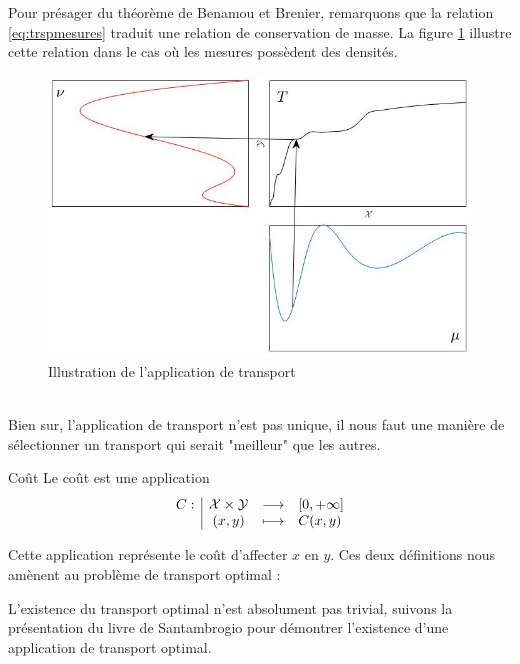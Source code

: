 \documentclass[a4paper,12pt]{article}
\begin{document}
Pour présager du théorème de Benamou et Brenier, remarquons que la relation \eqref{eq:trspmesures} traduit une relation de conservation de masse. La figure \ref{fig:illustrans} illustre cette relation dans le cas où les mesures possèdent des densités.
\begin{figure}[!h]
\centering
\includegraphics[width=0.8\linewidth]{img/transport.jpg}
\caption{\label{fig:illustrans}Illustration de l'application de transport}
\end{figure}\\
Bien sur, l'application de transport n'est pas unique, il nous faut une manière de sélectionner un transport qui serait "meilleur" que les autres. 
\newpage
\begin{definition}{Coût}
Le coût est une application 
$$
\begin{array}[t]{l|ccl} C: & \mathcal{X}\times\mathcal{Y} & \longrightarrow & [0,+\infty] \\ & (x,y) & \longmapsto & C(x,y) \end{array}
$$
\end{definition}
Cette application représente le coût d'affecter $x$ en $y$. Ces deux définitions nous amènent au problème de transport optimal : \\

\vspace{0.3cm}

L'existence du transport optimal n'est absolument pas trivial, suivons la présentation du livre de Santambrogio  \cite{santambrogio2015optimal} pour démontrer l'existence d'une application de transport optimal.
\end{document}

